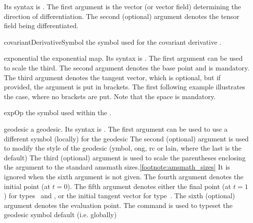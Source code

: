 \documentclass[english,a4paper,DIV=12,parskip=full,oneside]{scrartcl}
\begin{document}
\begin{commandlist}
		Its syntax is .
		The first argument is the vector (or vector field) determining the direction of differentiation.
		The second (optional) argument denotes the tensor field being differentiated.
		\par{}
	\item[covariantDerivativeSymbol]\hspace{4em}the symbol used for the covariant derivative \codeCommand{\covariantDerivative}.
		\par\mathCodeExample{\covariantDerivativeSymbol}
	\item[exponential] the exponential map.
		Its syntax is .
		The first argument can be used to scale the third.
		The second argument denotes the base point and is mandatory.
		The third argument denotes the tangent vector, which is optional, but if provided, the argument is put in brackets.
		The first following example illustrates the case, where no brackets are put.
		Note that the space is mandatory.
		\par{}
		\par{}
		\par{}
	\item[expOp] the symbol used within the \codeCommand{\exponential}.
		\par\mathCodeExample{\expOp}
	\item[geodesic] a geodesic.
		Its syntax is .%
		The first argument can be used to use a different symbol (locally) for the geodesic
		The second (optional) argument is used to modify the style of the geodesic (ymbol, ong, rc or lain, where the last is the default)
		The third (optional) argument is used to scale the parentheses enclosing the argument to the standard amsmath sizes.\cref{footnote:amsmath_sizes}
		It is ignored when the sixth argument is not given.
		The fourth argument denotes the initial point (at $t = 0$).
		The fifth argument denotes either the final point (at $t = 1$) for types~ and , or the initial tangent vector for type~.
		The sixth (optional) argument denotes the evaluation point.
		The command \codeCommand{\geodesicSymbol} is used to typeset the geodesic symbol default (i.e. globally)

\end{commandlist}
\end{document}
